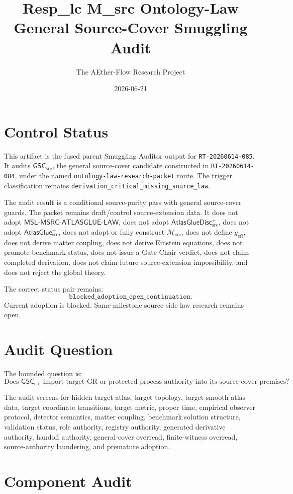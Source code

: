\documentclass[11pt]{article}
\title{Resp\_lc M\_src Ontology-Law General Source-Cover Smuggling Audit}
\author{The AEther-Flow Research Project}
\date{2026-06-21}
\newcommand{\Msrc}{\mathcal{M}_{\mathrm{src}}}
\newcommand{\geff}{g_{\mathrm{eff}}}
\newcommand{\AtlasGlue}{\mathsf{AtlasGlue}_{\mathrm{src}}^{+}}
\newcommand{\AtlasGlueDisc}{\mathsf{AtlasGlueDisc}_{\mathrm{src}}^{+}}
\newcommand{\MSL}{\mathsf{MSL}\mbox{-}\mathsf{MSRC}\mbox{-}\mathsf{ATLASGLUE}\mbox{-}\mathsf{LAW}}
\newcommand{\GSC}{\mathsf{GSC}_{\mathrm{src}}}
\begin{document}
\maketitle

\section*{Control Status}

This artifact is the fused parent Smuggling Auditor output for
\texttt{RT-20260614-085}. It audits \(\GSC\), the general source-cover
candidate constructed in \texttt{RT-20260614-084}, under the named
\texttt{ontology-law-research-packet} route. The trigger classification
remains \texttt{derivation\_critical\_missing\_source\_law}.

The audit result is a conditional source-purity pass with general source-cover
guards. The packet remains draft/control source-extension data. It does not
adopt \(\MSL\), does not adopt \(\AtlasGlueDisc\), does not adopt
\(\AtlasGlue\), does not adopt or fully construct \(\Msrc\), does not define
\(\geff\), does not derive matter coupling, does not derive Einstein
equations, does not promote benchmark status, does not issue a Gate Chair
verdict, does not claim completed derivation, does not claim future
source-extension impossibility, and does not reject the global theory.

The correct status pair remains:
\[
  \texttt{blocked\_adoption\_open\_continuation}.
\]
Current adoption is blocked. Same-milestone source-side law research remains
open.

\section{Audit Question}

The bounded question is:
\[
\text{Does }\GSC\text{ import target-GR or protected process authority into
its source-cover premises?}
\]

The audit screens for hidden target atlas, target topology, target smooth
atlas data, target coordinate transitions, target metric, proper time,
empirical observer protocol, detector semantics, matter coupling, benchmark
solution structure, validation status, role authority, registry authority,
generated derivative authority, handoff authority, general-cover overread,
finite-witness overread, source-authority laundering, and premature adoption.

\section{Component Audit}
\end{document}
